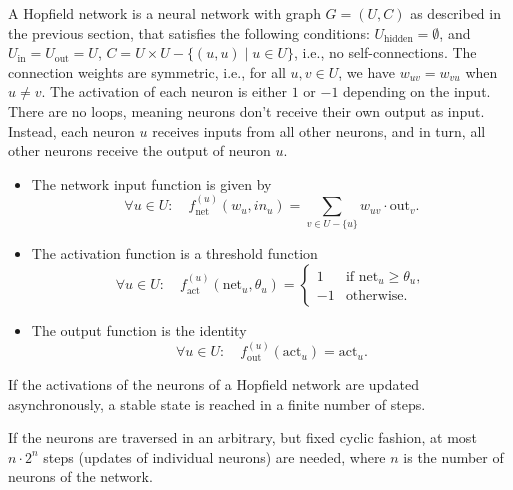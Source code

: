 \begin{definition}\label{Hopfield Network}
\leanok
A Hopfield network is a neural network with graph $G = (U,C)$ as described in the previous section, 
that satisfies the following conditions:
\( U_{\text{hidden}} = \emptyset \), and \( U_{\text{in}} = U_{\text{out}} = U \),
 \( C = U \times U - \{(u, u) \mid u \in U \} \), i.e., no self-connections. 
The connection weights are symmetric, i.e., for all \( u, v \in U \), we have \( w_{uv} = w_{vu} \) when \( u \neq v \). 
The activation of each neuron is either \( 1 \) or \( -1 \) depending on the input. There are no loops, meaning neurons don’t 
receive their own output as input. Instead, each neuron $u$ receives inputs from all other neurons, and in turn, all other neurons
 receive the output of neuron $u$. 
\begin{itemize}
\item The network input function is given by
    \[
  \forall u \in U : \quad f^{(u)}_{\text{net}}(w_u, in_u) = \sum_{v \in U - \{u\}} w_{uv} \cdot \text{out}_v.
  \]
\item The activation function is a threshold function
\[\forall u \in U : \quad f^{(u)}_{\text{act}}(\text{net}_u, \theta_u) =
  \begin{cases} 
    1 & \text{if } \text{net}_u \geq \theta_u, \\
    -1 & \text{otherwise}.
  \end{cases}
  \]
\item  The output function is the identity
\[\forall u \in U : \quad f^{(u)}_{\text{out}}(\text{act}_u) = \text{act}_u.
  \]
\end{itemize}
\end{definition}

\begin{theorem} \label{Convergence}
\leanok  
If the activations of the neurons of a Hopfield network are updated asynchronously,
a stable state is reached in a finite number of steps.
\end{theorem}

\begin{theorem} \label{ConvergenceCor}

\leanok  
If the neurons are 
traversed in an arbitrary, but fixed cyclic fashion, at most $n\cdot2^n$ steps
 (updates of individual neurons) are needed, where $n$ is the number of neurons of the network.
\end{theorem}

